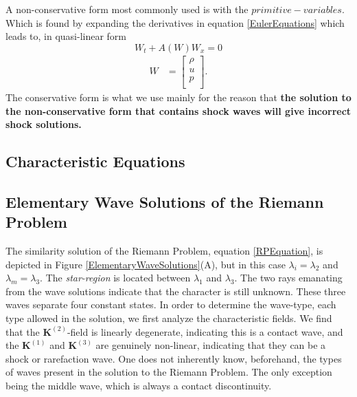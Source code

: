 \documentclass[]{article}
\begin{document}
		A non-conservative form most commonly used is with the $ primitive-variables $. Which is found by expanding the derivatives in equation \ref{EulerEquations} which leads to, in quasi-linear form
		\begin{equation}
			W_t + A(W) W_x = 0
		\end{equation}
		\begin{align}
			W &= \begin{bmatrix}
			\rho \\
			u \\
			p \\
			\end{bmatrix}.
			\label{PrimitiveVariables}
		\end{align}	
		The conservative form is what we use mainly for the reason that \textbf{the solution to the non-conservative form that contains shock waves will give incorrect shock solutions.}
		
		
	\subsection{Characteristic Equations}
		
	\subsection{Elementary Wave Solutions of the Riemann Problem}
		
		The similarity solution of the Riemann Problem, equation \ref{RPEquation}, is depicted in Figure \ref{ElementaryWaveSolutions}(A), but in this case $ \lambda_i = \lambda_2$ and $ \lambda_m = \lambda_3$. The \textit{star-region} is located between $ \lambda_1 $ and $ \lambda_3 $. The two rays emanating from the wave solutions indicate that the character is still unknown. These three waves separate four constant states. In order to determine the wave-type, each type allowed in the solution, we first analyze the characteristic fields. We find that the $ \textbf{K}^{(2)} $-field is linearly degenerate, indicating this is a contact wave, and the $ \textbf{K}^{(1)} $ and $ \textbf{K}^{(3)} $ are genuinely non-linear, indicating that they can be a shock or rarefaction wave. One does not inherently know, beforehand, the types of waves present in the solution to the Riemann Problem. The only exception being the middle wave, which is always a contact discontinuity.
		
\end{document}

